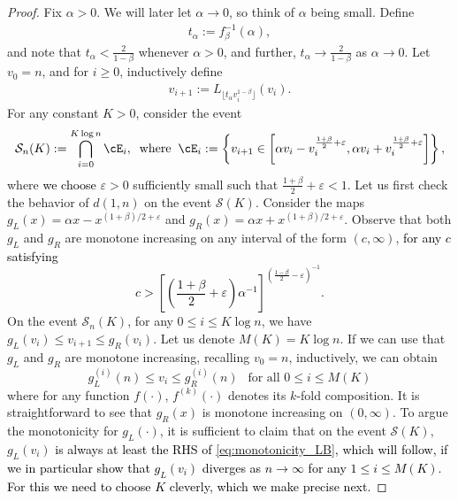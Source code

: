 \documentclass[letterpaper,11pt,reqno]{amsart}
\theoremstyle{definition}
\renewcommand{\leq}{\leqslant}
\renewcommand{\geq}{\geqslant}
\newcommand{\eps}{\varepsilon}
\newcommand{\cS}{\mathcal{S}}\newcommand{\cT}{\mathcal{T}}\newcommand{\cU}{\mathcal{U}}
\begin{document}
\begin{proof}
Fix $\alpha>0$. We will later let $\alpha \to 0$, so think of $\alpha$ being small. Define
\begin{align*}
    t_{\alpha}:=f_{\beta}^{-1}(\alpha),
\end{align*}
and note that $t_{\alpha}<\frac{2}{1-\beta}$ whenever $\alpha>0$, and further, $t_{\alpha} \to \frac{2}{1-\beta}$ as $\alpha \to 0$. Let $v_0=n$, and for $i \geq 0$, inductively define 
    \begin{align*}
        v_{i+1}:=L_{\lfloor t_{\alpha}v_i^{1-\beta} \rfloor}(v_i).
    \end{align*}
For any constant $K>0$, consider the event 
\begin{align*}
    \cS_n(K):=\bigcap_{i=0}^{K \log n}\cE_i,\;\;\text{where}\;\;\cE_i:=\left\{v_{i+1}\in\left[\alpha v_i - v_i^{\frac{1+\beta}{2}+\eps}, \alpha v_i + v_i^{\frac{1+\beta}{2}+\eps}\right] \right\},
\end{align*}
where \textcolor{black}{we choose} $\eps>0$ sufficiently small such that $\frac{1+\beta}{2}+\eps<1$. Let us first check the behavior of $d(1,n)$ on the event $\cS(K)$. Consider the maps $g_L(x)=\alpha x - x^{(1+\beta)/2+\eps}$ and $g_R(x)=\alpha x + x^{(1+\beta)/2+\eps}$. Observe that both $g_L$ and $g_R$ are monotone increasing on any interval of the form $(c,\infty)$, \textcolor{black}{for any $c$ satisfying 
\begin{equation}\label{eq:monotonicity_LB}
c>\left[\left(\frac{1+\beta}{2}+\eps \right)\alpha^{-1} \right]^{\left(\frac{1-\beta}{2}-\eps \right)^{-1}}.
\end{equation}} %
On the event $\cS_n(K)$, for any $0\leq i \leq K\log n$, we have $g_L(v_i)\leq v_{i+1} \leq g_R(v_i)$. Let us denote $M(K)=K \log n$. If we can use that $g_L$ and $g_R$ are monotone increasing, recalling $v_0=n$, inductively, we can obtain 
\begin{equation}\label{eq:final_label}
    g_L^{(i)}(n)\leq v_{i}\leq g_R^{(i)}(n) \ \ \text{ for all } 0\leq i\leq M(K)
\end{equation}
where for any function $f(\cdot)$, $f^{(k)}(\cdot)$ denotes its $k$-fold composition. It is straightforward to see that $g_R(x)$ is monotone increasing on $(0,\infty)$. To argue the monotonicity for $g_L(\cdot)$, it is sufficient to claim that on the event $\cS(K)$, $g_L(v_i)$ \textcolor{black}{is always at least the RHS of \eqref{eq:monotonicity_LB}, which will follow, if we in particular show that $g_L(v_i)$ diverges as $n \to \infty$ for any $1 \leq i \leq M(K)$. For this we need to choose $K$ cleverly, which we make precise next.} %


\end{proof}
\end{document}
